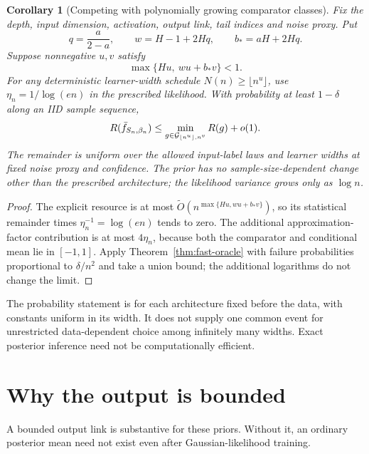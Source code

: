 \documentclass[11pt]{article}
\newtheorem{corollary}[theorem]{Corollary}\newtheorem{proposition}[theorem]{Proposition}
\theoremstyle{remark}\newtheorem{remark}[theorem]{Remark}
\begin{document}
\begin{corollary}[Competing with polynomially growing comparator classes]
\label{cor:growing-comparators}
Fix the depth, input dimension, activation, output link, tail indices and noise proxy. Put
\[
 q=\frac a{2-a},\qquad w=H-1+2Hq,\qquad b_*=aH+2Hq.
\]
Suppose nonnegative $u,v$ satisfy
\[
 \max\{Hu,\ wu+b_*v\}<1.
\]
For any deterministic learner-width schedule $N(n)\ge\lfloor n^u\rfloor$, use
$\eta_n=1/\log(en)$ in the prescribed likelihood. With probability at least $1-\delta$ along an IID sample sequence,
\[
 R(\bar f_{S_n,\beta_n})
 \le\min_{g\in\mathcal G_{\lfloor n^u\rfloor,n^v}}R(g)+o(1).
\]
The remainder is uniform over the allowed input-label laws and learner widths at fixed noise proxy and confidence. The prior has no sample-size-dependent change other than the prescribed architecture; the likelihood variance grows only as $\log n$.
\end{corollary}
\begin{proof}
The explicit resource is at most
$\widetilde O(n^{\max\{Hu,wu+b_*v\}})$, so its statistical remainder times $\eta_n^{-1}=\log(en)$ tends to zero. The additional approximation-factor contribution is at most $4\eta_n$, because both the comparator and conditional mean lie in $[-1,1]$. Apply Theorem~\ref{thm:fast-oracle} with failure probabilities proportional to $\delta/n^2$ and take a union bound; the additional logarithms do not change the limit.
\end{proof}

The probability statement is for each architecture fixed before the data, with constants uniform in its width. It does not supply one common event for unrestricted data-dependent choice among infinitely many widths. Exact posterior inference need not be computationally efficient.









\section{Why the output is bounded}
\label{sec:raw-mean}
A bounded output link is substantive for these priors. Without it, an ordinary posterior mean need not exist even after Gaussian-likelihood training.
\end{document}

